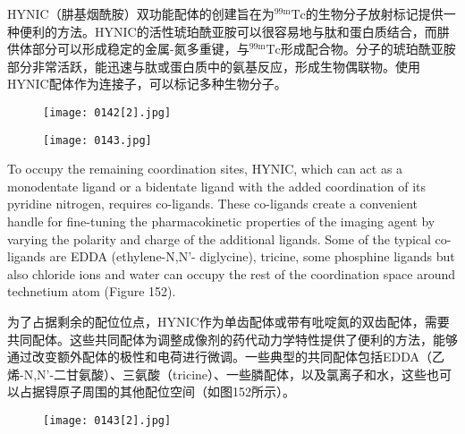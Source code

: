 \documentclass[dvipsnames, svgnames,a4paper,11pt]{article}
\begin{document}
HYNIC（肼基烟酰胺）双功能配体的创建旨在为${}^\mathrm{99m}\mathrm{Tc}$的生物分子放射标记提供一种便利的方法。HYNIC的活性琥珀酰亚胺可以很容易地与肽和蛋白质结合，而肼供体部分可以形成稳定的金属-氮多重键，与${}^\mathrm{99m}\mathrm{Tc}$形成配合物。分子的琥珀酰亚胺部分非常活跃，能迅速与肽或蛋白质中的氨基反应，形成生物偶联物。使用HYNIC配体作为连接子，可以标记多种生物分子。

\begin{figure}[h]
	\centering
    \texttt{[image: 0142[2].jpg]}    
     \label{fig150}
\end{figure}

\begin{figure}[h]
	\centering
    \texttt{[image: 0143.jpg]}    
     \label{fig151}
\end{figure}

To occupy the remaining coordination sites, HYNIC, which can act as a monodentate
ligand or a bidentate ligand with the added coordination of its pyridine nitrogen,
requires co-ligands. These co-ligands create a convenient handle for fine-tuning the
pharmacokinetic properties of the imaging agent by varying the polarity and charge
of the additional ligands. Some of the typical co-ligands are EDDA (ethylene-N,N'-
diglycine), tricine, some phosphine ligands but also chloride ions and water can
occupy the rest of the coordination space around technetium atom (Figure 152). 

为了占据剩余的配位位点，HYNIC作为单齿配体或带有吡啶氮的双齿配体，需要共同配体。这些共同配体为调整成像剂的药代动力学特性提供了便利的方法，能够通过改变额外配体的极性和电荷进行微调。一些典型的共同配体包括EDDA（乙烯-N,N'-二甘氨酸）、三氨酸（tricine）、一些膦配体，以及氯离子和水，这些也可以占据锝原子周围的其他配位空间（如图152所示）。

\begin{figure}[h]
	\centering
    \texttt{[image: 0143[2].jpg]}    
     \label{fig152}
\end{figure}
\end{document}
